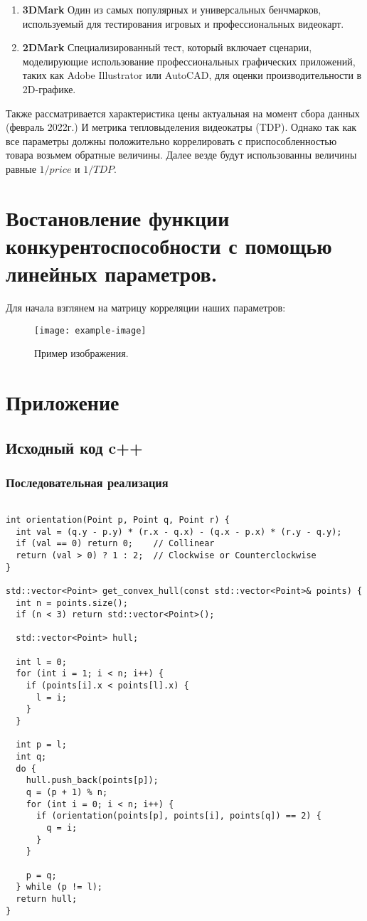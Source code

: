 \documentclass[14pt, a4paper]{extarticle}
\begin{document}
  \begin{enumerate}
    \item\textbf{3DMark} Один из самых популярных и универсальных бенчмарков, используемый для тестирования игровых и профессиональных видеокарт.
    \item\textbf{2DMark} Специализированный тест, который включает сценарии, моделирующие использование профессиональных графических приложений, таких как Adobe Illustrator или AutoCAD, для оценки производительности в 2D-графике.
  \end{enumerate}
  Также рассматривается характеристика цены актуальная на момент сбора данных (февраль 2022г.) И метрика тепловыделения видеокатры (TDP). Однако так как все параметры должны положительно коррелировать с приспособленностью товара возьмем обратные величины. Далее везде будут использованны величины равные \(1/price\) и \(1/TDP\).
  \newpage
  \section{Востановление функции конкурентоспособности с помощью линейных параметров.}
Для начала взглянем на матрицу корреляции наших параметров:
\begin{figure}[h]
  \centering
  \texttt{[image: example-image]}
  \caption{Пример изображения.}
  \label{fig:example}
\end{figure}
\newpage

  \section{Приложение}
\subsection{Исходный код c++}
  \subsubsection{Последовательная реализация}
  \begin{lstlisting}

int orientation(Point p, Point q, Point r) {
  int val = (q.y - p.y) * (r.x - q.x) - (q.x - p.x) * (r.y - q.y);
  if (val == 0) return 0;    // Collinear
  return (val > 0) ? 1 : 2;  // Clockwise or Counterclockwise
}

std::vector<Point> get_convex_hull(const std::vector<Point>& points) {
  int n = points.size();
  if (n < 3) return std::vector<Point>();

  std::vector<Point> hull;

  int l = 0;
  for (int i = 1; i < n; i++) {
    if (points[i].x < points[l].x) {
      l = i;
    }
  }

  int p = l;
  int q;
  do {
    hull.push_back(points[p]);
    q = (p + 1) % n;
    for (int i = 0; i < n; i++) {
      if (orientation(points[p], points[i], points[q]) == 2) {
        q = i;
      }
    }

    p = q;
  } while (p != l);
  return hull;
}

  \end{lstlisting}
  \newpage
\end{document}
